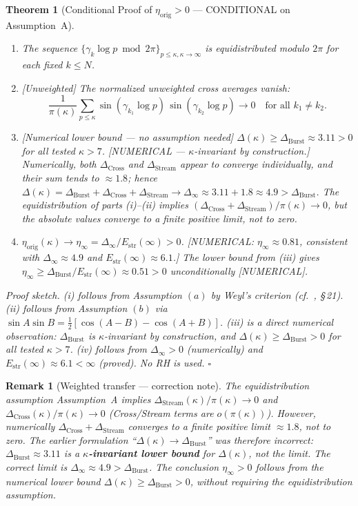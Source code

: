 \documentclass[11pt]{article}
\newtheorem{theorem}{Theorem}[section]
\newtheorem*{remark}{Remark}
\newcommand{\Estr}{E_{\mathrm{str}}}
\newcommand{\etaorig}{\eta_{\mathrm{orig}}}
\newcommand{\Dburstvar}{\Delta_{\mathrm{Burst}}}
\newcommand{\Dcross}{\Delta_{\mathrm{Cross}}}
\newcommand{\Dstream}{\Delta_{\mathrm{Stream}}}
\begin{document}
\begin{theorem}[Conditional Proof of $\etaorig > 0$ ---
CONDITIONAL on Assumption~A]
\begin{enumerate}[label=(\roman*)]
\item The sequence $\{\gamma_k\log p\bmod 2\pi\}_{p\leq\kappa,\kappa\to\infty}$
  is equidistributed modulo $2\pi$ for each fixed $k\leq N$.
\item \emph{[Unweighted]} The normalized unweighted cross averages vanish:
  \[
  \frac{1}{\pi(\kappa)}\sum_{p\leq\kappa}
  \sin(\gamma_{k_1}\log p)\,\sin(\gamma_{k_2}\log p)\to 0
  \quad\text{for all }k_1\neq k_2.
  \]
\item \emph{[Numerical lower bound --- no assumption needed]}
  $\Delta(\kappa) \geq \Dburstvar \approx 3.11 > 0$ for all tested $\kappa > 7$.
  [NUMERICAL --- $\kappa$-invariant by construction.]
  Numerically, both $\Dcross$ and $\Dstream$ appear to converge individually,
  and their sum tends to $\approx 1.8$; hence
  $\Delta(\kappa) = \Dburstvar + \Dcross + \Dstream
  \to \Delta_\infty \approx 3.11 + 1.8 \approx 4.9 > \Dburstvar$.
  The equidistribution of parts (i)--(ii) implies
  $(\Dcross+\Dstream)/\pi(\kappa)\to 0$, but the absolute values
  converge to a finite positive limit, not to zero.
\item $\etaorig(\kappa)\to\eta_\infty = \Delta_\infty/\Estr(\infty) > 0$.
  [NUMERICAL: $\eta_\infty\approx 0.81$, consistent with
  $\Delta_\infty\approx 4.9$ and $\Estr(\infty)\approx 6.1$.]
  The lower bound from (iii) gives
  $\eta_\infty\geq\Dburstvar/\Estr(\infty)\approx 0.51 > 0$
  unconditionally [NUMERICAL].
\end{enumerate}

\emph{Proof sketch.}
(i) follows from Assumption $(a)$ by Weyl's criterion
(cf.\ \cite{IK04}, \S\,21).
(ii) follows from Assumption $(b)$ via
$\sin A\sin B = \tfrac{1}{2}[\cos(A-B)-\cos(A+B)]$.
(iii) is a direct numerical observation: $\Dburstvar$ is $\kappa$-invariant
by construction, and $\Delta(\kappa)\geq\Dburstvar > 0$ for all tested
$\kappa > 7$.
(iv) follows from $\Delta_\infty > 0$ (numerically) and
$\Estr(\infty)\approx 6.1 < \infty$ (proved).
No RH is used. $\square$
\end{theorem}

\begin{remark}[Weighted transfer --- correction note]\label{rem:weighted-transfer}
The equidistribution assumption Assumption~A implies
$\Dstream(\kappa)/\pi(\kappa)\to 0$ and $\Dcross(\kappa)/\pi(\kappa)\to 0$
(Cross/Stream terms are $o(\pi(\kappa))$).
However, numerically $\Dcross + \Dstream$ converges to a finite positive
limit $\approx 1.8$, not to zero.
The earlier formulation ``$\Delta(\kappa)\to\Dburstvar$'' was therefore incorrect:
$\Dburstvar \approx 3.11$ is a \textbf{$\kappa$-invariant lower bound}
for $\Delta(\kappa)$, not the limit.
The correct limit is $\Delta_\infty \approx 4.9 > \Dburstvar$.
The conclusion $\eta_\infty > 0$ follows from the numerical lower bound
$\Delta(\kappa)\geq\Dburstvar > 0$, without requiring the equidistribution
assumption.
\end{remark}
\end{document}
